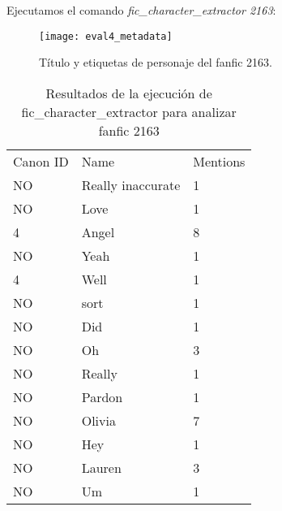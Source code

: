 \documentclass{pre-tfg}
\newcommand{\finalProgramName}{fic\_character\_extractor }
\begin{document}
Ejecutamos el comando \textit{\finalProgramName  2163}:

\begin{figure}[h]
	\centering
	\label{fig:eval4_metadata}
	\texttt{[image: eval4\_metadata]}
	\caption{Título y etiquetas de personaje del fanfic 2163.}
\end{figure}

\begin{table}[h]
	\begin{tabular}{lll}
		Canon ID & Name            & Mentions         \\
		NO       & Really inaccurate  & 1       \\
		NO       & Love       & 1        \\
		4       & Angel     & 8          \\
		NO       & Yeah        & 1    \\
		4       & Well       & 1    \\
		NO       & sort      & 1   \\
		NO       & Did      & 1    \\
		NO       & Oh       & 3    \\
		NO       & Really      & 1    \\
		NO       & Pardon     & 1    \\
		NO       & Olivia      & 7    \\
		NO       & Hey      & 1    \\
		NO       & Lauren      & 3    \\
		NO       & Um     & 1    \\
	\end{tabular}%
	\caption{Resultados de la ejecución de \finalProgramName para analizar fanfic 2163}
	\label{table:eval4_nertagger}
\end{table}
\end{document}
